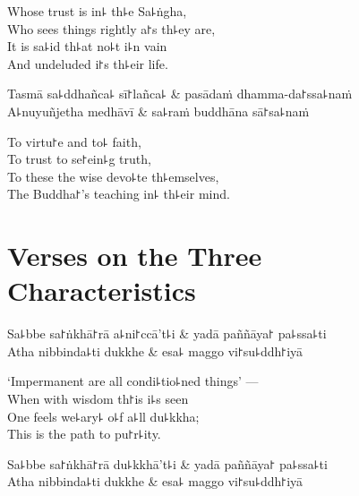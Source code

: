 \begin{english}
  Whose trust is in꜕ th꜕e Sa꜕ṅgha,\\
  Who sees things rightly a꜓s th꜕ey are,\\
  It is sa꜕id th꜕at no꜕t i꜕n vain\\
  And undeluded i꜓s th꜕eir life.
\end{english}

\begin{twochants}
  Tasmā sa꜕ddhañca꜕ sī꜓lañca꜕ & pasādaṁ dhamma-da꜓ssa꜕naṁ \\
  A꜕nuyuñjetha medhāvī & sa꜕raṁ buddhāna sā꜓sa꜕naṁ \\
\end{twochants}

\begin{english}
  To virtu꜓e and to꜕ faith,\\
  To trust to se꜓ein꜕g truth,\\
  To these the wise devo꜕te th꜕emselves,\\
  The Buddha꜓'s teaching in꜕ th꜕eir mind.
\end{english}

\chapter{Verses on the Three Characteristics}%


\begin{leader}
\end{leader}

\begin{twochants}
  Sa꜕bbe sa꜓ṅkhā꜓rā a꜕ni꜓ccā't꜕i & yadā paññāya꜓ pa꜕ssa꜕ti \\
  Atha nibbinda꜕ti dukkhe & esa꜕ maggo vi꜓su꜕ddh꜓iyā \\
\end{twochants}

\begin{english}
  `Impermanent are all condi꜕tio꜕ned things' ---\\
  When with wisdom th꜓is i꜕s seen\\
  One feels we꜕ary꜕ o꜕f a꜕ll du꜕kkha;\\
  This is the path to pu꜓r꜕ity.
\end{english}

\begin{twochants}
  Sa꜕bbe sa꜓ṅkhā꜓rā du꜕kkhā't꜕i & yadā paññāya꜓ pa꜕ssa꜕ti \\
  Atha nibbinda꜕ti dukkhe & esa꜕ maggo vi꜓su꜕ddh꜓iyā \\
\end{twochants}

